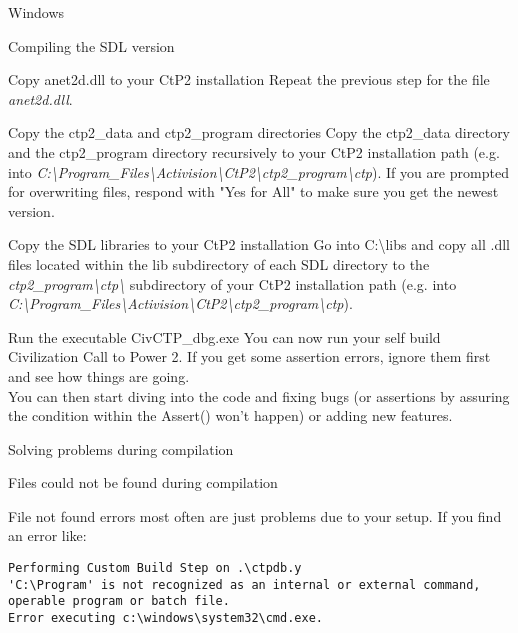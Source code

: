 \begin{section}{Windows}
\begin{subsection}{Compiling the SDL version}
\begin{subsubsection}{Copy anet2d.dll to your CtP2 installation}
Repeat the previous step for the file \textit{anet2d.dll}.
\end{subsubsection}%

\begin{subsubsection}{Copy the ctp2\_data and ctp2\_program directories}
Copy the ctp2\_data directory and the ctp2\_program directory recursively to your CtP2 installation path (e.g. into \textit{C:\textbackslash{}Program\_Files\textbackslash{}Activision\textbackslash{}CtP2\textbackslash{}ctp2\_program\textbackslash{}ctp}). If you are prompted for overwriting files, respond with "Yes for All" to make sure you get the newest version.
\end{subsubsection}%

\begin{subsubsection}{Copy the SDL libraries to your CtP2 installation}
Go into C:\textbackslash{}libs and copy all .dll files located within the lib subdirectory of each SDL directory to the \textit{ctp2\_program\textbackslash{}ctp\textbackslash{}} subdirectory of your CtP2 installation path (e.g. into \textit{C:\textbackslash{}Program\_Files\textbackslash{}Activision\textbackslash{}CtP2\textbackslash{}ctp2\_program\textbackslash{}ctp}).
\end{subsubsection}

\begin{subsubsection}{Run the executable CivCTP\_dbg.exe}
You can now run your self build Civilization Call to Power 2. If you get some assertion errors, ignore them first and see how things are going.\\
You can then start diving into the code and fixing bugs (or assertions by assuring the condition within the Assert() won't happen) or adding new features.
\end{subsubsection}%

\end{subsection}%

\begin{subsection}{Solving problems during compilation}

\begin{subsubsection}{Files could not be found during compilation}

File not found errors most often are just problems due to your setup.
If you find an error like:
\begin{verbatim}
Performing Custom Build Step on .\ctpdb.y
'C:\Program' is not recognized as an internal or external command,
operable program or batch file.
Error executing c:\windows\system32\cmd.exe.
\end{verbatim}


\end{subsubsection}
\end{subsection}
\end{section}
